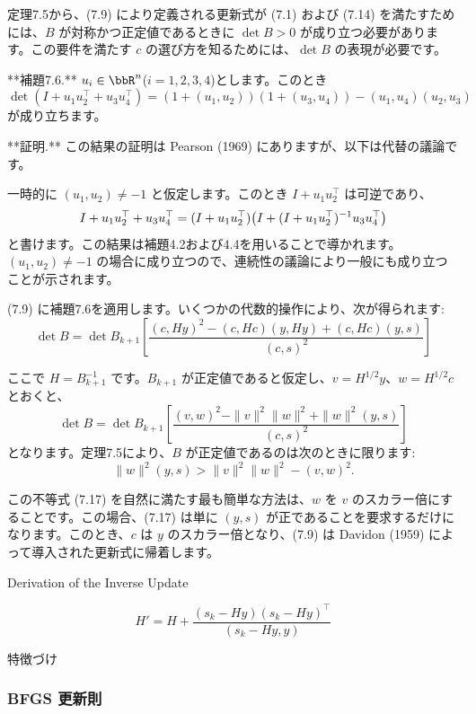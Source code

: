 \documentclass[a4paper, 10pt, dvipdfmx,draft]{article}
\begin{document}
定理7.5から、(7.9) により定義される更新式が (7.1) および (7.14) を満たすためには、$B$ が対称かつ正定値であるときに $\det B > 0$ が成り立つ必要があります。この要件を満たす $c$ の選び方を知るためには、$\det B$ の表現が必要です。

**補題7.6.** $u_i \in \bbR^n$($i = 1, 2, 3, 4$)とします。このとき
$$
    \det(I + u_1 u_2^\top + u_3 u_4^\top) = (1 + (u_1, u_2))(1 + (u_3, u_4)) - (u_1, u_4)(u_2, u_3)
$$
が成り立ちます。

**証明.** この結果の証明は Pearson (1969) にありますが、以下は代替の議論です。

一時的に $(u_1, u_2) \neq -1$ と仮定します。このとき $I + u_1 u_2^\top$ は可逆であり、
$$
    I + u_1 u_2^\top + u_3 u_4^\top = (I + u_1 u_2^\top)\qty(I + (I + u_1 u_2^\top)^{-1} u_3 u_4^\top)
$$
と書けます。この結果は補題4.2および4.4を用いることで導かれます。$(u_1, u_2) \neq -1$ の場合に成り立つので、連続性の議論により一般にも成り立つことが示されます。

(7.9) に補題7.6を適用します。いくつかの代数的操作により、次が得られます:
\begin{equation*}
    \det B = \det B_{k+1} \left[\frac{(c, H y)^2 - (c, H c)(y, H y) + (c, H c)(y, s)}{(c, s)^2}\right]
\end{equation*}

ここで $H = B_{k+1}^{-1}$ です。$B_{k+1}$ が正定値であると仮定し、$v = H^{1/2} y$、$w = H^{1/2} c$ とおくと、
\begin{equation}
    \det B = \det B_{k+1} \left[\frac{(v, w)^2 - \|v\|^2 \|w\|^2 + \|w\|^2 (y, s)}{(c, s)^2}\right] \tag{7.16}
\end{equation}
となります。定理7.5により、$B$ が正定値であるのは次のときに限ります:
\begin{equation}
    \|w\|^2 (y, s) > \|v\|^2 \|w\|^2 - (v, w)^2. \tag{7.17}
\end{equation}

この不等式 (7.17) を自然に満たす最も簡単な方法は、$w$ を $v$ のスカラー倍にすることです。この場合、(7.17) は単に $(y, s)$ が正であることを要求するだけになります。このとき、$c$ は $y$ のスカラー倍となり、(7.9) は Davidon (1959) によって導入された更新式に帰着します。

Derivation of the Inverse Update

$$
    H' = H + \frac{(s_k - Hy)(s_k - Hy)^\top}{(s_k - Hy, y)}
$$

特徴づけ

\subsubsection{BFGS 更新則}
\end{document}
